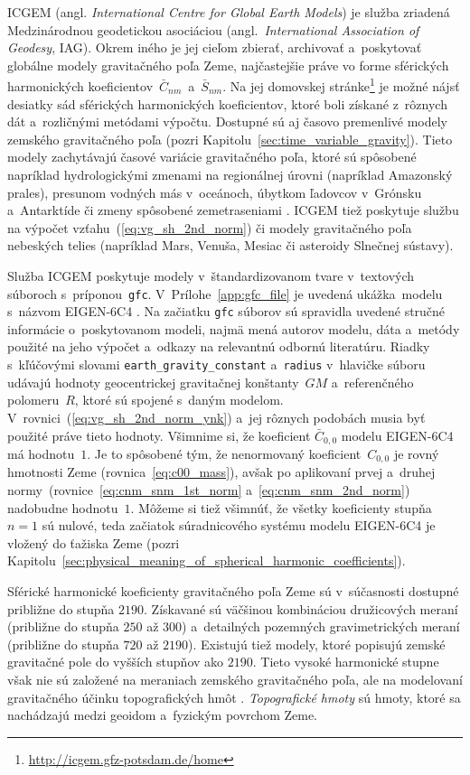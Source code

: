 \documentclass[a4paper, 12pt]{book}
\begin{document}
ICGEM (angl. \emph{International Centre for Global Earth Models}) je služba 
zriadená Medzinárodnou geodetickou asociáciou (angl.~\emph{International 
Association of Geodesy}, IAG).  Okrem iného je jej cieľom zbierať, archivovať 
a~poskytovať globálne modely gravitačného poľa Zeme, najčastejšie práve vo 
forme sférických harmonických koeficientov~$\bar{C}_{nm}$~a~$\bar{S}_{nm}$.  Na 
jej domovskej 
stránke\footnote{\label{fn:icgem_link}\url{http://icgem.gfz-potsdam.de/home}} 
je možné nájsť desiatky sád sférických harmonických koeficientov, ktoré boli 
získané z~rôznych dát a~rozličnými metódami výpočtu.  Dostupné sú aj časovo 
premenlivé modely zemského gravitačného poľa (pozri 
Kapitolu~\ref{sec:time_variable_gravity}).  Tieto modely zachytávajú časové 
variácie gravitačného poľa, ktoré sú spôsobené napríklad hydrologickými zmenami 
na regionálnej úrovni (napríklad Amazonský prales), presunom vodných más 
v~oceánoch, úbytkom ľadovcov v~Grónsku a~Antarktíde či zmeny spôsobené 
zemetraseniami \parencite{Wahr2007}.  ICGEM tiež poskytuje službu na výpočet 
vzťahu~(\ref{eq:vg_sh_2nd_norm}) či modely gravitačného poľa nebeských telies 
(napríklad Mars, Venuša, Mesiac či asteroidy Slnečnej sústavy).

Služba ICGEM poskytuje modely v~štandardizovanom tvare v~textových súboroch 
s~príponou~\texttt{gfc}.  V~Prílohe~\ref{app:gfc_file} je uvedená ukážka~modelu 
s~názvom EIGEN-6C4 \parencite{EIGEN-6C4}.  Na začiatku \texttt{gfc} súborov sú 
spravidla uvedené stručné informácie o~poskytovanom modeli, najmä mená autorov 
modelu, dáta a~metódy použité na jeho výpočet a~odkazy na relevantnú odbornú 
literatúru.  Riadky s~kľúčovými slovami \texttt{earth\_gravity\_constant} 
a~\texttt{radius} v~hlavičke súboru udávajú hodnoty geocentrickej gravitačnej 
konštanty~$GM$ a~referenčného polomeru~$R$, ktoré sú spojené s~daným modelom.  
V~rovnici~(\ref{eq:vg_sh_2nd_norm_ynk}) a~jej rôznych podobách musia byť 
použité práve tieto hodnoty.  Všimnime si, že koeficient $\bar{C}_{0,0}$ modelu 
EIGEN-6C4 má hodnotu~$1$.  Je to spôsobené tým, že nenormovaný 
koeficient~$C_{0,0}$ je rovný hmotnosti Zeme (rovnica~\ref{eq:c00_mass}), avšak 
po aplikovaní prvej a~druhej normy~(rovnice~\ref{eq:cnm_snm_1st_norm} 
a~\ref{eq:cnm_snm_2nd_norm}) nadobudne hodnotu~$1$.  Môžeme si tiež všimnúť, že 
všetky koeficienty stupňa~$n = 1$ sú nulové, teda začiatok súradnicového 
systému modelu EIGEN-6C4 je vložený do ťažiska Zeme (pozri 
Kapitolu~\ref{sec:physical_meaning_of_spherical_harmonic_coefficients}).

Sférické harmonické koeficienty gravitačného poľa Zeme sú v~súčasnosti dostupné
približne do stupňa $2190$.  Získavané sú väčšinou kombináciou družicových
meraní (približne do stupňa $250$ až $300$) a~detailných pozemných
gravimetrických meraní (približne do stupňa $720$ až $2190$).  Existujú tiež 
modely, ktoré popisujú zemské gravitačné pole do vyšších stupňov ako $2190$.  
Tieto vysoké harmonické stupne však nie sú založené na meraniach zemského 
gravitačného poľa, ale na modelovaní gravitačného účinku topografických hmôt 
\parencite[napríklad][]{Ince2020}.  \emph{Topografické 
hmoty}\label{def:topographic_masses} sú hmoty, ktoré sa nachádzajú medzi 
geoidom a~fyzickým povrchom Zeme.
\end{document}
